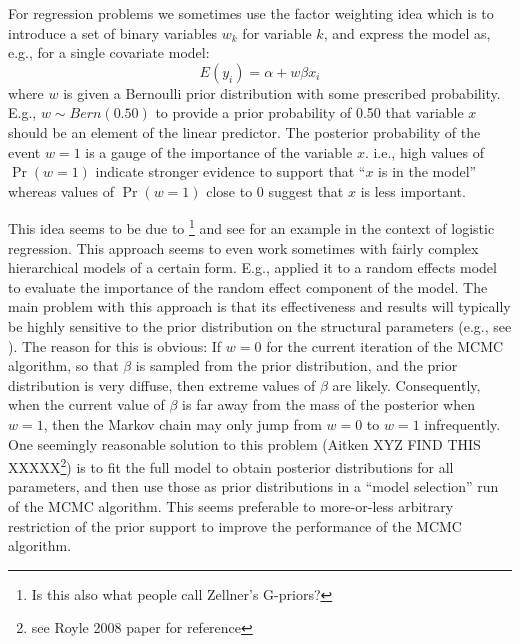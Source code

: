 For regression problems we sometimes use the factor weighting idea
which is to introduce a set of binary variables $w_{k}$ for variable
$k$, and express the model as, e.g., for a single covariate model:
 \[
 E(y_i) = \alpha + w \beta x_{i}
\]
where $w$ is given a Bernoulli prior distribution with some prescribed
probability. E.g., $w \sim Bern(0.50)$ to provide a prior probability
of 0.50 that variable $x$ should be an element of the linear
predictor. The posterior probability of the event $w=1$ is a gauge of
the importance of the variable $x$. i.e., high values of $\Pr(w=1)$
indicate stronger evidence to support that ``$x$ is in the model''
whereas values of $\Pr(w=1)$ close to 0 suggest that $x$ is less
important.



This idea seems to be due to \citet{kuo_mallick:1998}\footnote{ Is
  this also what people call Zellner's G-priors?} and see
\citet[][ch. XXXX]{royle_dorazio:2008} for an example in the context
of logistic regression. This approach seems to even work sometimes
with fairly complex hierarchical models of a certain form. E.g.,
\citet{royle:2008} applied it to a random effects model to evaluate
the importance of the random effect component of the model.  The main
problem with this approach is that its effectiveness and results will
typically be highly sensitive to the prior distribution on the
structural parameters (e.g., see \citet[][table xyz]{royle_dorazio:2008}).
The reason for this is obvious: If $w = 0$ for the current
iteration of the MCMC algorithm, so that $\beta$ is sampled from the
prior distribution, and the prior distribution is very diffuse, then
extreme values of $\beta$ are likely. Consequently, when the current value of
$\beta$ is
far away from the mass of the posterior when $w=1$, then the Markov
chain may only jump from $w=0$ to $w=1$ infrequently.  One seemingly
reasonable solution to this problem (Aitken XYZ FIND THIS
XXXXX\footnote{see Royle 2008 paper for reference}) is to fit the full
model to obtain posterior distributions for all parameters, and then
use those as prior distributions in a ``model selection'' run of the
MCMC algorithm.  This seems preferable to more-or-less arbitrary restriction of
the prior support to improve the performance of the MCMC algorithm.


